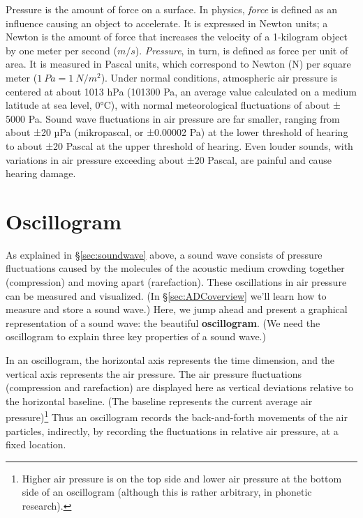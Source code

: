 \documentclass[
]{book}
\begin{document}
Pressure is the amount of force on a surface. In physics, \emph{force} is defined as an influence causing an object to accelerate. It is expressed in Newton units; a Newton is the amount of force that increases the velocity of a 1-kilogram object by one meter per second (\(m/s\)). \emph{Pressure}, in turn, is defined as force per unit of area. It is measured in Pascal units, which correspond to Newton (N) per square meter (\(1\ Pa = 1\ N/m^2\)).
Under normal conditions, atmospheric air pressure is centered at about 1013 hPa (101300 Pa, an average value calculated on a medium latitude at sea level, 0°C), with normal meteorological fluctuations of about ± 5000 Pa. Sound wave fluctuations in air pressure are far smaller, ranging from about ±20 µPa (mikropascal, or ±0.00002 Pa) at the lower threshold of hearing to about ±20 Pascal at the upper threshold of hearing. Even louder sounds, with variations in air pressure exceeding about ±20 Pascal, are painful and cause hearing damage.

\section{Oscillogram}\label{sec-oscillogram}

As explained in §\ref{sec:soundwave} above, a sound wave consists of pressure fluctuations caused by the molecules of the acoustic medium crowding together (compression) and moving apart (rarefaction). These oscillations in air pressure can be measured and visualized. (In §\ref{sec:ADCoverview} we'll learn how to measure and store a sound wave.) Here, we jump ahead and present a graphical representation of a sound wave: the beautiful \textbf{oscillogram}. (We need the oscillogram to explain three key properties of a sound wave.)

In an oscillogram, the horizontal axis represents the time dimension, and the vertical axis represents the air pressure. The air pressure fluctuations (compression and rarefaction) are displayed here as vertical deviations relative to the horizontal baseline. (The baseline represents the current average air pressure)\footnote{Higher air pressure is on the top side and lower air pressure at the bottom side of an oscillogram (although this is rather arbitrary, in phonetic research).} Thus an oscillogram records the back-and-forth movements of the air particles, indirectly, by recording the fluctuations in relative air pressure, at a fixed location.
\end{document}
